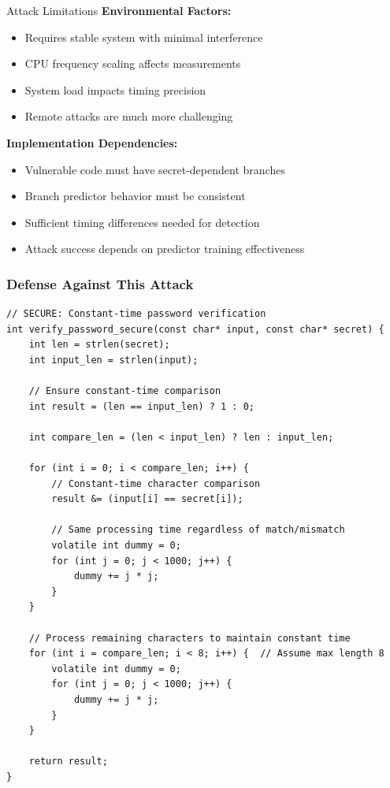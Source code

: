 \documentclass[11pt,a4paper]{article}
\theoremstyle{definition}
\begin{document}
\begin{attackbox}{Attack Limitations}
\textbf{Environmental Factors:}
\begin{itemize}
    \item Requires stable system with minimal interference
    \item CPU frequency scaling affects measurements
    \item System load impacts timing precision
    \item Remote attacks are much more challenging
\end{itemize}

\textbf{Implementation Dependencies:}
\begin{itemize}
    \item Vulnerable code must have secret-dependent branches
    \item Branch predictor behavior must be consistent
    \item Sufficient timing differences needed for detection
    \item Attack success depends on predictor training effectiveness
\end{itemize}
\end{attackbox}

\subsubsection{Defense Against This Attack}

\begin{lstlisting}[caption={Secure Constant-Time Password Verification}]
// SECURE: Constant-time password verification
int verify_password_secure(const char* input, const char* secret) {
    int len = strlen(secret);
    int input_len = strlen(input);
    
    // Ensure constant-time comparison
    int result = (len == input_len) ? 1 : 0;
    
    int compare_len = (len < input_len) ? len : input_len;
    
    for (int i = 0; i < compare_len; i++) {
        // Constant-time character comparison
        result &= (input[i] == secret[i]);
        
        // Same processing time regardless of match/mismatch
        volatile int dummy = 0;
        for (int j = 0; j < 1000; j++) {
            dummy += j * j;
        }
    }
    
    // Process remaining characters to maintain constant time
    for (int i = compare_len; i < 8; i++) {  // Assume max length 8
        volatile int dummy = 0;
        for (int j = 0; j < 1000; j++) {
            dummy += j * j;
        }
    }
    
    return result;
}
\end{lstlisting}
\end{document}
